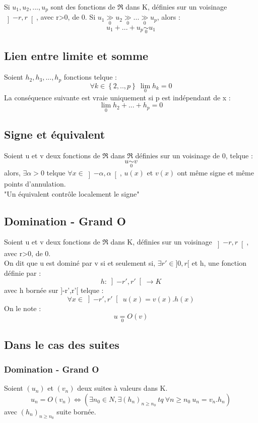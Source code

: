 \begin{prop}
Si $u_1,u_2,...,u_p$ sont des fonctions de $\Re$ dans K, définies sur un voisinage $\left]-r,r\right[$, avec r>0, de 0.
Si $u_1 \underset{0}\gg u_2 \underset{0}\gg ... \underset{0}\gg u_p$, alors : 
$$u_1+...+u_p \underset{0}\sim u_1$$
\end{prop}
\subsection{Lien entre limite et somme}
\begin{prop}
Soient $h_2,h_3,...,h_p$ fonctions telque :
$$\forall k \in \left\lbrace2,..,p\right\rbrace~ \lim_0 h_k = 0$$
La conséquence suivante est vraie uniquement si p est indépendant de x :
$$\lim_0 h_2+...+h_p = 0$$
\end{prop}
\subsection{Signe et équivalent}
\begin{prop}
Soient u et v deux fonctions de $\Re$ dans $\Re$ définies sur un voisinage de 0, telque :
$$u \underset{0}\sim v$$
alors, $\exists \alpha > 0$ telque $\forall x \in \left]-\alpha,\alpha\right[ $, $u(x)$ et $v(x)$ ont même signe et même points d'annulation.\\
"Un équivalent contrôle localement le signe"
\end{prop}
\subsection{Domination - Grand O}
\begin{de}
Soient u et v deux fonctions de $\Re$ dans K, définies sur un voisinage $\left]-r,r \right[ $, avec r>0, de 0.\\
On dit que u est dominé par v si et seulement si, $\exists r' \in ]0,r[$ et h, une fonction définie par : 
$$h : \left] -r',r' \right[  \rightarrow K$$
avec h bornée sur ]-r',r'[ telque : 
$$\forall x \in \left]-r',r'\right[~ u(x) = v(x).h(x)$$
On le note :
$$u \underset{0}= O(v)$$
\end{de}
\subsection{Dans le cas des suites}
\subsubsection{Domination - Grand O}
\begin{de}
Soient $(u_n)$ et $(v_n)$ deux suites à valeurs dans K.
$$u_n = O(v_n) \Leftrightarrow (\exists n_0 \in N, \exists (h_n)_{n \geq n_0}~ tq~ \forall n \geq n_0~ u_n=v_n.h_n)$$
avec $(h_n)_{n \geq n_0}$ suite bornée.
\end{de}
